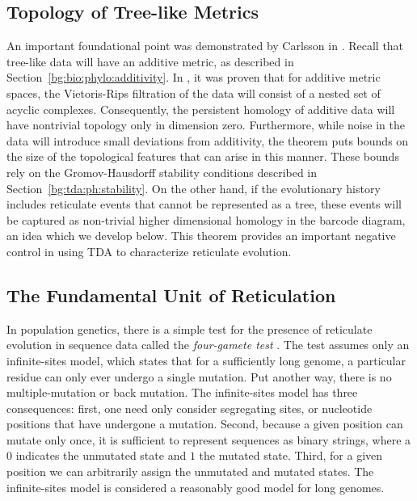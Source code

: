 \subsection{Topology of Tree-like Metrics}
\label{bg:top4bio:treemetrics}

An important foundational point was demonstrated by Carlsson in \cite{Chan:2013}.
Recall that tree-like data will have an additive metric, as described in Section~\ref{bg:bio:phylo:additivity}.
In \cite{Chan:2013}, it was proven that for additive metric spaces, the Vietoris-Rips filtration of the data will consist of a nested set of acyclic complexes.
Consequently, the persistent homology of additive data will have nontrivial topology only in dimension zero.
Furthermore, while noise in the data will introduce small deviations from additivity, the theorem puts bounds on the size of the topological features that can arise in this manner.
These bounds rely on the Gromov-Hausdorff stability conditions described in Section~\ref{bg:tda:ph:stability}.
On the other hand, if the evolutionary history includes reticulate events that cannot be represented as a tree, these events will be captured as non-trivial higher dimensional homology in the barcode diagram, an idea which we develop below.
This theorem provides an important negative control in using TDA to characterize reticulate evolution.

\subsection{The Fundamental Unit of Reticulation}
\label{bg:top4bio:fundamental_unit}

In population genetics, there is a simple test for the presence of reticulate evolution in sequence data called the \emph{four-gamete test} \cite{Hudson:1985}.
The test assumes only an infinite-sites model, which states that for a sufficiently long genome, a particular residue can only ever undergo a single mutation.
Put another way, there is no multiple-mutation or back mutation.
The infinite-sites model has three consequences: first, one need only consider segregating sites, or nucleotide positions that have undergone a mutation.
Second, because a given position can mutate only once, it is sufficient to represent sequences as binary strings, where a $0$ indicates the unmutated state and $1$ the mutated state.
Third, for a given position we can arbitrarily assign the unmutated and mutated states.
The infinite-sites model is considered a reasonably good model for long genomes.

